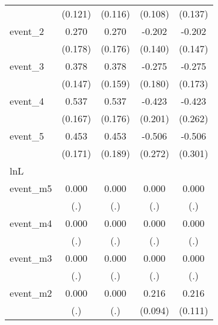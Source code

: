 {\begin{tabular}{l*{4}{c}}
            &     (0.121)         &     (0.116)         &     (0.108)         &     (0.137)         \\
[1em]
event\_2     &       0.270         &       0.270         &      -0.202         &      -0.202         \\
            &     (0.178)         &     (0.176)         &     (0.140)         &     (0.147)         \\
[1em]
event\_3     &       0.378\sym{*}  &       0.378\sym{*}  &      -0.275         &      -0.275         \\
            &     (0.147)         &     (0.159)         &     (0.180)         &     (0.173)         \\
[1em]
event\_4     &       0.537\sym{**} &       0.537\sym{**} &      -0.423\sym{*}  &      -0.423         \\
            &     (0.167)         &     (0.176)         &     (0.201)         &     (0.262)         \\
[1em]
event\_5     &       0.453\sym{**} &       0.453\sym{*}  &      -0.506         &      -0.506         \\
            &     (0.171)         &     (0.189)         &     (0.272)         &     (0.301)         \\
\hline
lnL         &                     &                     &                     &                     \\
event\_m5    &       0.000         &       0.000         &       0.000         &       0.000         \\
            &         (.)         &         (.)         &         (.)         &         (.)         \\
[1em]
event\_m4    &       0.000         &       0.000         &       0.000         &       0.000         \\
            &         (.)         &         (.)         &         (.)         &         (.)         \\
[1em]
event\_m3    &       0.000         &       0.000         &       0.000         &       0.000         \\
            &         (.)         &         (.)         &         (.)         &         (.)         \\
[1em]
event\_m2    &       0.000         &       0.000         &       0.216\sym{*}  &       0.216         \\
            &         (.)         &         (.)         &     (0.094)         &     (0.111)         \\

\end{tabular}}
